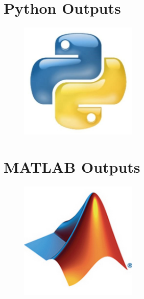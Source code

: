 \documentclass{article}
\begin{document}
\vspace{2cm}  %



\section{Python Outputs}
\begin{figure}[h]
    \centering
    \includegraphics[width=0.5\textwidth]{Python-Logo.jpg}
\end{figure}

\vspace{2cm}  %


\section{MATLAB Outputs}
\begin{figure}[h]
    \centering
    \includegraphics[width=0.5\textwidth]{Matlab-Logo.jpg}
\end{figure}
\end{document}
